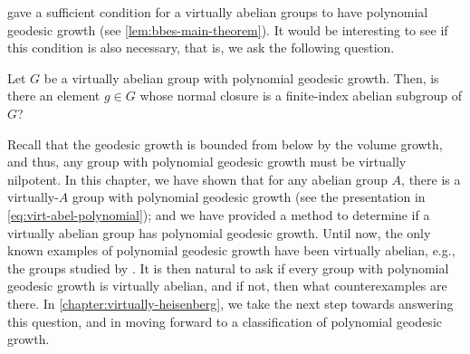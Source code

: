  gave a sufficient condition for a virtually abelian groups to have polynomial geodesic growth (see \cref{lem:bbes-main-theorem}).
It would be interesting to see if this condition is also necessary, that is, we ask the following question.

\begin{question}
	Let $G$ be a virtually abelian group with polynomial geodesic growth.
	Then, is there an element $g \in G$ whose normal closure is a finite-index abelian subgroup of $G$?
\end{question}

Recall that the geodesic growth is bounded from below by the volume growth, and thus, any group with polynomial geodesic growth must be virtually nilpotent.
In this chapter, we have shown that for any abelian group $A$, there is a virtually-$A$ group with polynomial geodesic growth (see the presentation in \cref{eq:virt-abel-polynomial}); and we have provided a method to determine if a virtually abelian group has polynomial geodesic growth.
Until now, the only known examples of polynomial geodesic growth have been virtually abelian, e.g., the groups studied by \textcite{bridson2012}.
It is then natural to ask if every group with polynomial geodesic growth is virtually abelian, and if not, then what counterexamples are there.
In \cref{chapter:virtually-heisenberg}, we take the next step towards answering this question, and in moving forward to a classification of polynomial geodesic growth.